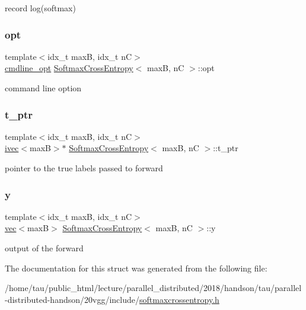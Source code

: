 record log(softmax) \mbox{\label{structSoftmaxCrossEntropy_a5b1fcafb5b11b7c6c09c228fb442a888}} 
\subsubsection{\texorpdfstring{opt}{opt}}
{\footnotesize\ttfamily template$<$idx\+\_\+t maxB, idx\+\_\+t nC$>$ \\
\hyperlink{structcmdline__opt}{cmdline\+\_\+opt} \hyperlink{structSoftmaxCrossEntropy}{Softmax\+Cross\+Entropy}$<$ maxB, nC $>$\+::opt}

command line option \mbox{\label{structSoftmaxCrossEntropy_a58fadb0af31e34384df054ab40b88201}} 
\subsubsection{\texorpdfstring{t\+\_\+ptr}{t\_ptr}}
{\footnotesize\ttfamily template$<$idx\+\_\+t maxB, idx\+\_\+t nC$>$ \\
\hyperlink{structivec}{ivec}$<$maxB$>$$\ast$ \hyperlink{structSoftmaxCrossEntropy}{Softmax\+Cross\+Entropy}$<$ maxB, nC $>$\+::t\+\_\+ptr}

pointer to the true labels passed to forward \mbox{\label{structSoftmaxCrossEntropy_a375b984851163f54de4196a385c6d8e6}} 
\subsubsection{\texorpdfstring{y}{y}}
{\footnotesize\ttfamily template$<$idx\+\_\+t maxB, idx\+\_\+t nC$>$ \\
\hyperlink{structvec}{vec}$<$maxB$>$ \hyperlink{structSoftmaxCrossEntropy}{Softmax\+Cross\+Entropy}$<$ maxB, nC $>$\+::y}

output of the forward 

The documentation for this struct was generated from the following file\+:\begin{DoxyCompactItemize}
\item 
/home/tau/public\+\_\+html/lecture/parallel\+\_\+distributed/2018/handson/tau/parallel-\/distributed-\/handson/20vgg/include/\hyperlink{softmaxcrossentropy_8h}{softmaxcrossentropy.\+h}\end{DoxyCompactItemize}
